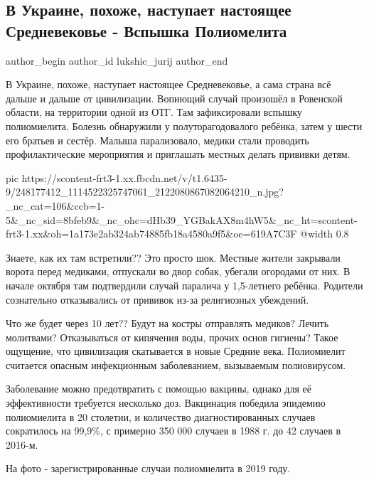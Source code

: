  
 
 
 
 
 
\subsection{В Украине, похоже, наступает настоящее Средневековье - Вспышка Полиомелита}
\label{sec:22_10_2021.fb.lukshic_jurij.1.srednevekovie_poliomelit}
 
\ifcmt
 author_begin
   author_id lukshic_jurij
 author_end
\fi

В Украине, похоже, наступает настоящее Средневековье, а сама страна всё дальше
и дальше от цивилизации. Вопиющий случай произошёл в Ровенской области, на
территории одной из ОТГ. Там зафиксировали вспышку полиомиелита. Болезнь
обнаружили у полуторагодовалого ребёнка, затем у шести его братьев и сестёр.
Малыша парализовало, медики стали проводить профилактические мероприятия и
приглашать местных делать прививки детям.

\ifcmt
  pic https://scontent-frt3-1.xx.fbcdn.net/v/t1.6435-9/248177412_1114522325747061_2122080867082064210_n.jpg?_nc_cat=106&ccb=1-5&_nc_sid=8bfeb9&_nc_ohc=dHb39_YGBakAX8m4hW5&_nc_ht=scontent-frt3-1.xx&oh=1a173e2ab324ab74885fb18a4580a9f5&oe=619A7C3F
  @width 0.8
\fi

Знаете, как их там встретили?? Это просто шок. Местные жители закрывали ворота
перед медиками, отпускали во двор собак, убегали огородами от них. В начале
октября там подтвердили случай паралича у 1,5-летнего ребёнка. Родители
сознательно отказывались от прививок из-за религиозных убеждений.

Что же будет через 10 лет?? Будут на костры отправлять медиков? Лечить
молитвами? Отказываться от кипячения воды, прочих основ гигиены? Такое
ощущение, что цивилизация скатывается в новые Средние века. Полиомиелит
считается опасным инфекционным заболеванием, вызываемым полиовирусом.

Заболевание можно предотвратить с помощью вакцины, однако для её эффективности
требуется несколько доз. Вакцинация победила эпидемию полиомиелита в 20
столетии, и количество диагностированных случаев сократилось на 99,9\%, с
примерно 350 000 случаев в 1988 г. до 42 случаев в 2016-м.  

На фото - зарегистрированные случаи полиомиелита в 2019 году.


